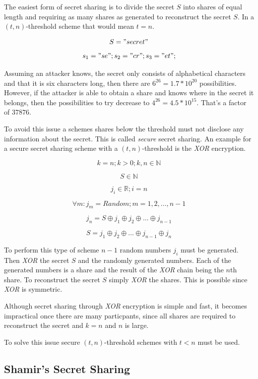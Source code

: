 The easiest form of secret sharing is to divide the secret $S$ into shares of
equal length and requiring as many shares as generated to reconstruct the
secret $S$. In a $(t, n)$-threshold scheme that would mean $t = n$.

$$S = "secret"$$
$$s_1 = "se"; s_2 = "cr"; s_3 = "et";$$

Assuming an attacker knows, the secret only consists of alphabetical characters
and that it is six characters long, then there are $6^{26} = 1.7 * 10^{20}$
possibilities.  However, if the attacker is able to obtain a share and knows
where in the secret it belongs, then the possibilities to try decrease to
$4^{26} = 4.5 * 10^{15}$. That's a factor of $37876$.

To avoid this issue a schemes shares below the threshold must not disclose any
information about the secret. This is called \textit{secure} secret sharing.
An example for a secure secret sharing scheme with a $(t, n)$-threshold is the
\textit{XOR} encryption.

$$k = n; k > 0;k, n \in \mathbb{N}$$

$$S \in \mathbb{N}$$

$$j_{i} \in \mathbb{R}; i = n$$

$$\forall m: j_{m} = Random; m = {1, 2, ..., n-1}$$

$$j_{n} = S \oplus j_{1} \oplus j_{2} \oplus ... \oplus j_{n-1} $$

$$S = j_{1} \oplus j_{2} \oplus ... \oplus j_{n-1} \oplus j_{n} $$

To perform this type of scheme $n-1$ random numbers $j_{i}$ must be generated.
Then \textit{XOR} the secret $S$ and the randomly generated numbers. Each of
the generated numbers is a share and the result of the \textit{XOR} chain being
the $n$th share. To reconstruct the secret $S$ simply \textit{XOR} the shares.
This is possible since \textit{XOR} is symmetric.

Although secret sharing through \textit{XOR} encryption is simple and fast, it
becomes impractical once there are many particpants, since all shares are
required to reconstruct the secret and $k = n$ and $n$ is large.

To solve this issue secure $(t, n)$-threshold schemes with $t < n$ must be
used.

\subsection{Shamir's Secret Sharing}

